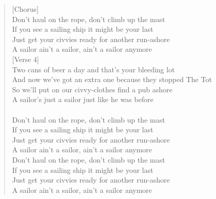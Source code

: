 \documentclass[11pt]{article}
\begin{document}
\begin{verse}
[Chorus]\\
Don't haul on the rope, don't climb up the mast\\
If you see a sailing ship it might be your last\\
Just get your civvies ready for another run-ashore\\
A sailor ain't a sailor, ain't a sailor anymore\\
\vspace*{1em}
[Verse 4]\\
Two cans of beer a day and that's your bleeding lot\\
And now we've got an extra one because they stopped The Tot\\
So we'll put on our civvy-clothes find a pub ashore\\
A sailor's just a sailor just like he was before\\
[Chorus]\\
Don't haul on the rope, don't climb up the mast\\
If you see a sailing ship it might be your last\\
Just get your civvies ready for another run-ashore\\
A sailor ain't a sailor, ain't a sailor anymore\\
Don't haul on the rope, don't climb up the mast\\
If you see a sailing ship it might be your last\\
Just get your civvies ready for another run-ashore\\
A sailor ain't a sailor, ain't a sailor anymore\\
\end{verse}
\clearpage
\end{document}

